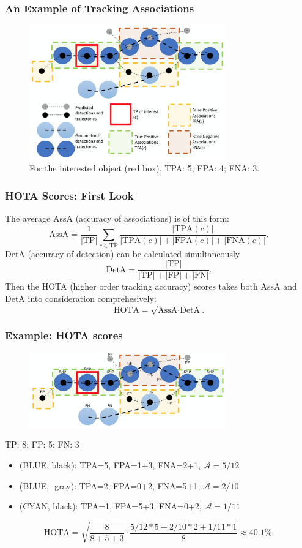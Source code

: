 \documentclass[slidetop, mathserif, dvipsnames]{beamer}
\begin{document}
\begin{frame}
	\frametitle{An Example of Tracking Associations}
	\begin{figure}
		\includegraphics[width=240pt]{pics/fig8.png}
		\caption{For the interested object (red box), TPA: 5; FPA: 4; FNA: 3.}
	\end{figure}
\end{frame}

\begin{frame}
	\frametitle{HOTA Scores: First Look}

	The average AssA (accuracy of associations) is of this form:
	\[
		\text{AssA} = \dfrac{1}{|\text{TP}|} \sum_{c\in\text{TP}} \dfrac{|\text{TPA}(c)|}{|\text{TPA}(c)|+|\text{FPA}(c)|+|\text{FNA}(c)|}.
	\]
	DetA (accuracy of detection) can be calculated simultaneously
	\[
		\text{DetA} = \dfrac{|\text{TP}|}{|\text{TP}| +|\text{FP}| + |\text{FN}|}.
	\]
	Then the HOTA (higher order tracking accuracy) scores takes both
	AssA and DetA into consideration comprehesively:
	\[
		\text{HOTA} = \sqrt{\text{AssA} \cdot \text{DetA}}.
	\]

\end{frame}

\begin{frame}
	\frametitle{Example: HOTA scores}

	\begin{figure}
		\includegraphics[width=240pt]{pics/track06.png}
	\end{figure}

	\vspace{-20pt}
	TP: 8; FP: 5; FN: 3
	\begin{itemize}
	\item ({\color{MidnightBlue}BLUE}, black): TPA=5, FPA=1+3, FNA=2+1, $\mathcal A= 5/12$
	\item ({\color{MidnightBlue}BLUE},\,\, {\color{gray}gray}): TPA=2, FPA=0+2, FNA=5+1, $\mathcal A=2/10$
	\item ({\color{cyan}CYAN}, black): TPA=1, FPA=5+3, FNA=0+2, $\mathcal A=1/11$
	\end{itemize}

	\vspace{-10pt}
	\[
		\text{HOTA} = \sqrt{\dfrac{8}{8+5+3} \cdot \dfrac{5/12*5 + 2/10*2 + 1/11*1}{8}} \approx 40.1\%.
	\]

\end{frame}
\end{document}
